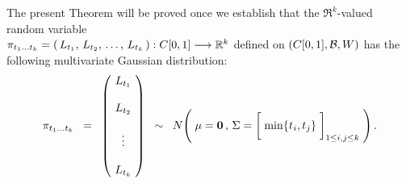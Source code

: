 \vskip 0.3cm
\noindent
The present Theorem will be proved once we establish that the $\Re^{k}$-valued random variable\\
$\pi_{t_{1}\ldots t_{k}} = \left(\,L_{t_{1}},\,L_{t_{2}},\,\ldots,\,L_{t_{k}}\,\right) : C[0,1] \longrightarrow \mathbb{R}^{k}$
defined on $\left(C[0,1],\mathcal{B},W\right)$ has the following multivariate Gaussian distribution:
\begin{equation*}
\pitok
\;\; = \;\;
\left(\!
\begin{array}{c}
L_{t_{1}} \\ \\ L_{t_{2}} \\ \\ \vdots \\ \\ L_{t_{k}} 
\end{array}
\!\right)
\;\; \sim \;\;
N\!\left(\;
\mathbf{\mu} = \mathbf{0}\,,\,
\Sigma = \left[\;\min\{\overset{{\color{white}1}}{t}_{i},t_{j}\}\;\right]_{1\leq i,j\leq k}
\;\right).
\end{equation*}

